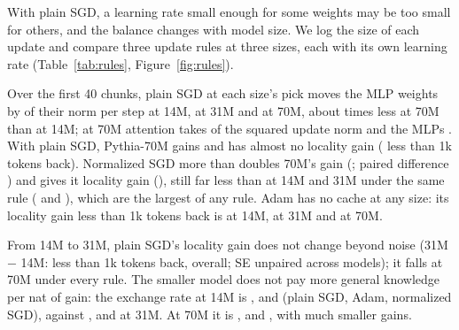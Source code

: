 \documentclass[10pt]{article}
\begin{document}
With plain SGD, a learning rate small enough for some weights may be too small for others, and the balance changes with model size.
We log the size of each update and compare three update rules at three sizes, each with its own learning rate (Table~\ref{tab:rules}, Figure~\ref{fig:rules}).

Over the first 40 chunks, plain SGD at each size's pick moves the MLP weights by \relMlpFourteen{} of their norm per step at 14M, \relMlpThirtyOne{} at 31M and \relMlpSeventy{} at 70M, about \mlpStepRatio{} times less at 70M than at 14M; at 70M attention takes \shareAttnSeventy{} of the squared update norm and the MLPs \shareMlpSeventy{}.
With plain SGD, Pythia-70M gains \rGainSgdSeventyPM{} and has almost no locality gain (\rLocOneKSgdSeventyPM{} less than 1k tokens back).
Normalized SGD more than doubles 70M's gain (\rGainNsgdSeventyPM{}; paired difference \nsgdMinusSgdGainSeventyPM{}) and gives it locality gain (\rLocOneKNsgdSeventyPM{}), still far less than at 14M and 31M under the same rule (\rLocOneKNsgdFourteenPM{} and \rLocOneKNsgdThirtyOnePM{}), which are the largest of any rule.
Adam has no cache at any size: its locality gain less than 1k tokens back is \rLocOneKAdamFourteenPM{} at 14M, \rLocOneKAdamThirtyOnePM{} at 31M and \rLocOneKAdamSeventyPM{} at 70M.

From 14M to 31M, plain SGD's locality gain does not change beyond noise (31M $-$ 14M: \locDiffThirtyOneFourteenOneKPM{} less than 1k tokens back, \locDiffThirtyOneFourteenAllPM{} overall; SE unpaired across models); it falls at 70M under every rule.
The smaller model does not pay more general knowledge per nat of gain: the exchange rate at 14M is \rExchangeSgdFourteen{}, \rExchangeAdamFourteen{} and \rExchangeNsgdFourteen{} (plain SGD, Adam, normalized SGD), against \rExchangeSgdThirtyOne{}, \rExchangeAdamThirtyOne{} and \rExchangeNsgdThirtyOne{} at 31M.
At 70M it is \rExchangeSgdSeventy{}, \rExchangeAdamSeventy{} and \rExchangeNsgdSeventy{}, with much smaller gains.

\begin{table}[t]
\centering\footnotesize\setlength{\tabcolsep}{2.8pt}
\resizebox{\linewidth}{!}{}
\caption{Three update rules at three sizes, all parameters, each at its val-pick learning rate: gain with $K=1$ over each model's frozen loss and locality gain (in order $-$ shuffled, paired; ``loc.\ gain'' in the header), $\pm$ SE over books; collateral forgetting on WikiText ($K=1$, second half of the stream, $\pm$ SE over chunks); exchange rate (stream gain / collateral forgetting on WikiText) in order and shuffled. $\dagger$: under 2 SE.}
\label{tab:rules}
\end{table}
\end{document}
